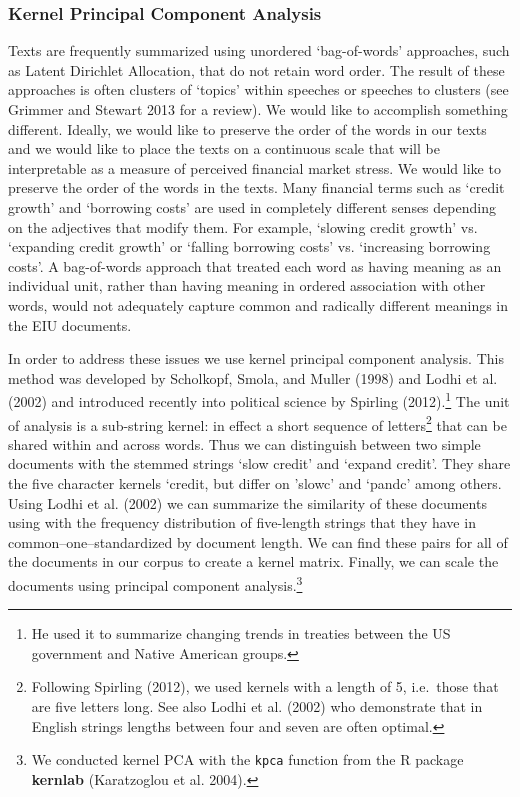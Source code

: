 \documentclass[]{article}
\let\rmarkdownfootnote\footnote%
\def\footnote{\protect\rmarkdownfootnote}
\begin{document}
\subsubsection{Kernel Principal Component
Analysis}\label{kernel-principal-component-analysis}

Texts are frequently summarized using unordered `bag-of-words'
approaches, such as Latent Dirichlet Allocation, that do not retain word
order. The result of these approaches is often clusters of `topics'
within speeches or speeches to clusters (see Grimmer and Stewart 2013
for a review). We would like to accomplish something different. Ideally,
we would like to preserve the order of the words in our texts and we
would like to place the texts on a continuous scale that will be
interpretable as a measure of perceived financial market stress. We
would like to preserve the order of the words in the texts. Many
financial terms such as `credit growth' and `borrowing costs' are used
in completely different senses depending on the adjectives that modify
them. For example, `slowing credit growth' vs. `expanding credit growth'
or `falling borrowing costs' vs. `increasing borrowing costs'. A
bag-of-words approach that treated each word as having meaning as an
individual unit, rather than having meaning in ordered association with
other words, would not adequately capture common and radically different
meanings in the EIU documents.

In order to address these issues we use kernel principal component
analysis. This method was developed by Scholkopf, Smola, and Muller
(1998) and Lodhi et al. (2002) and introduced recently into political
science by Spirling (2012).\footnote{He used it to summarize changing
  trends in treaties between the US government and Native American
  groups.} The unit of analysis is a sub-string kernel: in effect a
short sequence of letters\footnote{Following Spirling (2012), we used
  kernels with a length of 5, i.e.~those that are five letters long. See
  also Lodhi et al. (2002) who demonstrate that in English strings
  lengths between four and seven are often optimal.} that can be shared
within and across words. Thus we can distinguish between two simple
documents with the stemmed strings `slow credit' and `expand credit'.
They share the five character kernels `credit, but differ on 'slowc' and
`pandc' among others. Using Lodhi et al. (2002) we can summarize the
similarity of these documents using with the frequency distribution of
five-length strings that they have in common--one--standardized by
document length. We can find these pairs for all of the documents in our
corpus to create a kernel matrix. Finally, we can scale the documents
using principal component analysis.\footnote{We conducted kernel PCA
  with the \texttt{kpca} function from the R package \textbf{kernlab}
  (Karatzoglou et al. 2004).}
\end{document}
